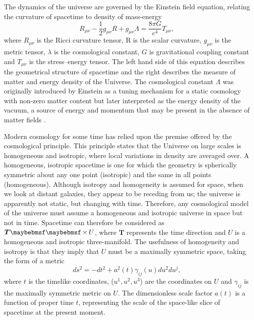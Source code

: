 The dynamics of the universe are governed by the Einstein field equation, relating the curvature of spacetime to density of mass-energy \cite{Gravity}
%
\begin{equation}\label{eq:einstein_field_eq}
  R_{\mu\nu} - \frac{1}{2} g_{\mu\nu}R + g_{\mu\nu}\Lambda = \frac{8\pi{}G}{c^4} T_{\mu\nu},
\end{equation}
%
where $R_{\mu\nu}$ is the Ricci curvature tensor, R is the scalar curvature, $g_{\mu\nu}$ is the metric tensor, $\lambda$ is the cosmological constant, $G$ is gravitational coupling constant and $T_{\mu\nu}$ is the stress–energy tensor. The left hand side of this equation describes the geometrical structure of spacetime and the right describes the measure of matter and energy density of the Universe. The cosmological constant $\Lambda$ was originally introduced by Einstein as a tuning mechanism for a static cosmology with non-zero matter content but later interpreted as the energy density of the vacuum, a source of energy and momentum that may be present in the absence of matter fields \cite{SeanC}.

Modern cosmology for some time has relied upon the premise offered by the cosmological principle. This principle states that the Universe on large scales is homogeneous and isotropic, where local variations in density are averaged over. A homogeneous, isotropic spacetime is one for which the geometry is spherically symmetric about any one point (isotropic) and the same in all points (homogeneous). Although isotropy and homogeneity is assumed for space, when we look at distant galaxies, they appear to be receding from us; the universe is apparently not static, but changing with time. Therefore, any cosmological model of the universe must assume a homogeneous and isotropic universe in space but not in time. Spacetime can therefore be considered as $\boldsymbol{T} \cross U$, where $\boldsymbol{T}$ represents the time direction and $U$ is a homogeneous and isotropic three-manifold. The usefulness of homogeneity and isotropy is that they imply that $U$ must be a maximally symmetric space, taking the form of a metric
%
\begin{equation}
    ds^2 = -dt^2 + a^2(t)\gamma_{ij}(u)du^2du^j,  
\end{equation}
%
where $t$ is the timelike coordinates, ($u^1, u^2, u^3$) are the coordinates on $U$ and $\gamma_{ij}$ is the maximally symmetric metric on $U$. The dimensionless scale factor $a(t)$ is a function of proper time $t$, representing the scale of the space-like slice of spacetime at the present moment.


